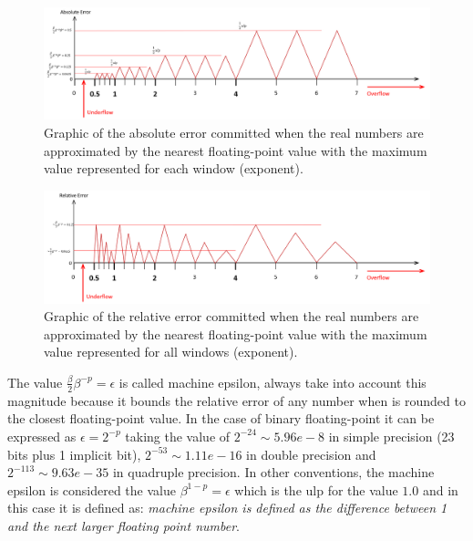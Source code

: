 \begin{figure}[h]
    \centering
    \includegraphics[width= \textwidth]{./doc/Figures/AbsErrorGraph.png}
    \caption{Graphic of the absolute error committed when the real numbers are approximated by the nearest floating-point value with the maximum value represented for each window (exponent).}
    \label{fig:AbsErrorGraph}
\end{figure}

\begin{figure}[h]
    \centering
    \includegraphics[width= \textwidth]{./doc/Figures/RelErrorGraph.png}
    \caption{Graphic of the relative error committed when the real numbers are approximated by the nearest floating-point value with the maximum value represented for all windows (exponent).}
    \label{fig:RelErrorGraph}
\end{figure}

\begin{IN}
    The value $\frac{\beta}{2}\beta^{-p} = \epsilon$ is called machine epsilon, always take into account this magnitude because it bounds the relative error of any number when is rounded to the closest floating-point value. In the case of binary floating-point it can be expressed as $\epsilon = 2^{-p}$ taking the value of $2^{-24} \sim 5.96e-8$ in simple precision (23 bits plus 1 implicit bit), $2^{-53} \sim 1.11e-16$ in double precision and $2^{-113} \sim 9.63e-35$ in quadruple precision. In other conventions, the machine epsilon is considered the value $\beta^{1-p} = \epsilon$ which is the ulp for the value $1.0$ and in this case it is defined as: \textit{machine epsilon is defined as the difference between 1 and the next larger floating point number}.
\end{IN}

